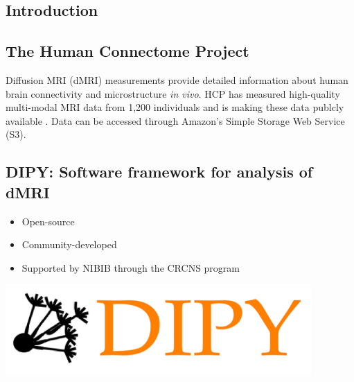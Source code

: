 \documentclass[a0, landscape]{a0poster}
\begin{document}
\vspace{0.5cm} %


\begin{multicols}{3} %


\section*{Introduction}

\subsection*{The Human Connectome Project}

Diffusion MRI (dMRI) measurements provide detailed information about human brain
connectivity and microstructure \emph{in vivo}. HCP has measured high-quality
multi-modal MRI data from 1,200 individuals and is making these data publcly
available \cite{glasser2016}. Data can be accessed through Amazon's Simple
Storage Web Service (S3).

\subsection*{DIPY: Software framework for analysis of dMRI \cite{Garyfallidis2014FrontNeuroinf}}

\begin{minipage}[b]{1\linewidth}
\begin{minipage}[b]{0.35\linewidth}
    \begin{itemize}
    \item Open-source
    \item Community-developed
    \item Supported by NIBIB through the CRCNS program
    \end{itemize}
\end{minipage}
\begin{minipage}[b]{0.65\linewidth}
    \includegraphics[height=3.5cm]{dipy-logo.png}
\end{minipage}
\end{minipage}


\end{multicols}
\end{document}
